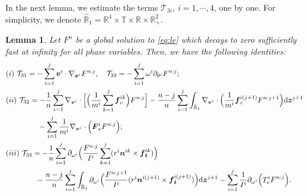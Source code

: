 \documentclass[a4paper,11pt]{article}
\numberwithin{equation}{section}
\newtheorem{lemma}[theorem]{Lemma}
\theoremstyle{definition}
\newcommand{\bfx}{\boldsymbol{x}}
\newcommand{\bfz}{\boldsymbol{z}}
\newcommand{\bfv}{\boldsymbol{v}}
\newcommand{\bfn}{\boldsymbol{n}}
\newcommand{\bft}{\boldsymbol{t}}
\newcommand{\bff}{\boldsymbol{f}}
\newcommand{\bfF}{\boldsymbol{F}}
\newcommand{\bbr}{\mathbb R}
\def\d{{  \rm d}}
\newcommand{\T}{\mathcal{T}}
\begin{document}
In the next lemma, we estimate the terms $\T_{3i},~i=1,\cdots, 4$, one by one. 
For simplicity, we denote $\hat{\bbr}_1 = \bbr^{4}\times \mathbb{T}\times \bbr \times \bbr_+^{2}$. 
%
%
\begin{lemma} \label{lem:T3}
Let $F^n$ be a global solution to \eqref{eq:le} which decays to zero sufficiently fast at infinity for all phase variables.  Then, we have  the following identities:
\begin{align*}
& (i)~\T_{31} = -  \sum_{i=1}^j  \bfv^i  \cdot \nabla_{\bfx^i} F^{n:j}, \quad \T_{33}  =  -\sum_{i=1}^j  \omega^i  \partial_{\theta^i}  F^{n:j}; \\
& (ii)~\T_{32} =  -\frac{1}{n} \sum_{i=1}^{j}  \nabla_{\bfv^i} \cdot  \Big[ \Big( \frac{1}{m^i}  \sum_{k=1}^{j} \bff_c^{ik} \Big)  F^{n:j} \Big] 
 -\frac{n-j}{n} \sum_{i=1}^{j}  \int_{\hat{\bbr}_1} \nabla_{\bfv^i} \cdot \Big( \frac{1}{m^i} \bff_c^{i(j+1)} F^{n:j+1} \Big)\d\bfz^{j+1} \\
& \hspace{1.5cm}  - \sum_{i=1}^{j} \frac{1}{m^i}  \nabla_{\bfv^i} \cdot \Big(\bfF^i_e F^{n:j} \Big); \\
& (iii)~\T_{34} =-\frac{1}{n} \sum_{i=1}^{j}  \partial_{\omega^i} \Big( \frac{F^{n:j} }{I^i}  \sum_{k=1}^{j} ( r^i\bfn^{ik}\times \bff_{\bft}^{ik}) \Big)  \\
& \qquad \qquad -\frac{n-j}{n} \sum_{i=1}^{j}  \int_{\hat{\bbr}_1} \partial_{\omega^i}\Big( \frac{F^{n:j+1}}{I^i} ( r^i\bfn^{i(j+1)}\times \bff_{\bft}^{i(j+1)}) \Big)\d\bfz^{j+1}
- \sum_{i=1}^{j}  \frac{1}{I^i} \partial_{\omega^i} \Big( T^i_e F^{n:j} \Big).
\end{align*}
\end{lemma}
%
\end{document}
